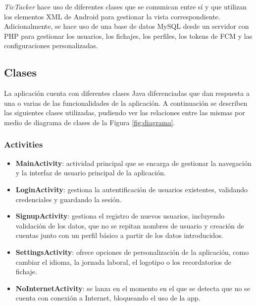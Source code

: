 \textit{TicTacker} hace uso de diferentes clases que se comunican entre sí y que utilizan los elementos XML de Android para gestionar la vista correspondiente. Adicionalmente, se hace uso de una base de datos MySQL desde un servidor con PHP para gestionar los usuarios, los fichajes, los perfiles, los tokens de FCM y las configuraciones personalizadas.

\subsection{Clases}
La aplicación cuenta con diferentes clases Java diferenciadas que dan respuesta a una o varias de las funcionalidades de la aplicación. A continuación se describen las siguientes clases utilizadas, pudiendo ver las relaciones entre las mismas por medio de diagrama de clases de la Figura \ref{fig:diagrama}.

\subsubsection{Activities}
\begin{itemize}
  \item \textbf{MainActivity}: actividad principal que se encarga de gestionar la navegación y la interfaz de usuario principal de la aplicación.
  \item \textbf{LoginActivity}: gestiona la autentificación de usuarios existentes, validando credenciales y guardando la sesión.
  \item \textbf{SignupActivity}: gestiona el registro de nuevos usuarios, incluyendo validación de los datos, que no se repitan nombres de usuario y creación de cuentas junto con un perfil básico a partir de los datos introducidos.
  \item \textbf{SettingsActivity}: ofrece opciones de personalización de la aplicación, como cambiar el idioma, la jornada laboral, el logotipo o los recordatorios de fichaje.
  \item \textbf{NoInternetActivity}: se lanza en el momento en el que se detecta que no se cuenta con conexión a Internet, bloqueando el uso de la app.
\end{itemize}

